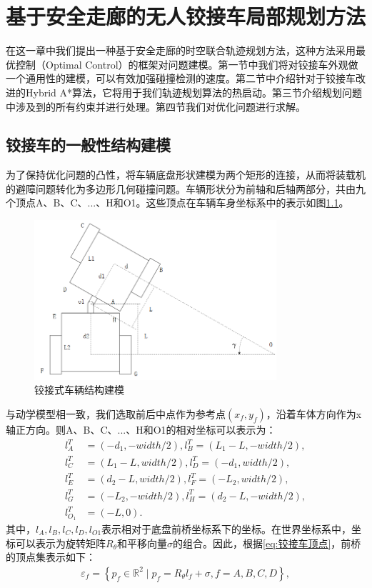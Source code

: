 \documentclass[master,academic]{ysuthesis} %
\begin{document}
	\chapter{基于安全走廊的无人铰接车局部规划方法}
	在这一章中我们提出一种基于安全走廊的时空联合轨迹规划方法，这种方法采用最优控制（Optimal Control）的框架对问题建模。第一节中我们将对铰接车外观做一个通用性的建模，可以有效加强碰撞检测的速度。第二节中介绍针对于铰接车改进的Hybrid A*算法，它将用于我们轨迹规划算法的热启动。第三节介绍规划问题中涉及到的所有约束并进行处理。第四节我们对优化问题进行求解。
	\section{铰接车的一般性结构建模}
	为了保持优化问题的凸性，将车辆底盘形状建模为两个矩形的连接，从而将装载机的避障问题转化为多边形几何碰撞问题。车辆形状分为前轴和后轴两部分，共由九个顶点A、B、C、...、H和O1。这些顶点在车辆车身坐标系中的表示如图\ref{fig:铰接车外观结构建模}。
	\begin{figure}[!ht]
		\centering
		\includegraphics[width=0.8\textwidth]{ppi.png}
		\caption{铰接式车辆结构建模}
		\label{fig:铰接车外观结构建模}
	\end{figure}

	与动学模型相一致，我们选取前后中点作为参考点$(x_f,y_f)$，沿着车体方向作为x轴正方向。则A、B、C、...、H和O1的相对坐标可以表示为：
	\begin{equation}
		\begin{aligned}
			l_{A}^{T}&=( -d_1,-width/2 ) ,l_{B}^{T}=( L_1-L,-width/2 ) ,\\
			l_{C}^{T}&=( L_1-L,width/2 ) ,l_{D}^{T}=( -d_1,width/2 ) ,\\
			l_{E}^{T}&=( d_2-L,width/2 ) ,l_{F}^{T}=( -L_2,width/2 ) ,\\
			l_{G}^{T}&=( -L_2,-width/2 ) ,l_{H}^{T}=( d_2-L,-width/2 ) ,\\
			l_{O_1}^{T}&=( -L,0 ) .
		\end{aligned}
		\label{eq:铰接车顶点}
	\end{equation}
	其中，$l_A,l_B,l_C,l_D,l_{O1}$表示相对于底盘前桥坐标系下的坐标。在世界坐标系中，坐标可以表示为旋转矩阵$R_\theta$和平移向量$\sigma$的组合。因此，根据\ref{eq:铰接车顶点}，前桥的顶点集表示如下：
	\begin{equation}
	\begin{aligned}
		\varepsilon_f = \left\{ p_f \in \mathbb{R}^2 \mid p_f=R_\theta l_f+\sigma,  f = A,B,C,D \right\},
	\end{aligned} 
	\end{equation}
	
\end{document}
